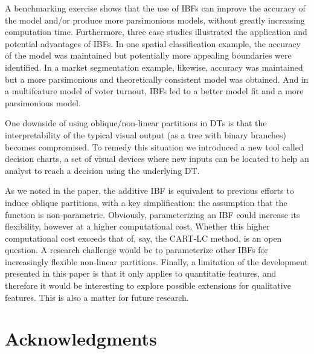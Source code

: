 \documentclass[]{elsarticle} %
\begin{document}
A benchmarking exercise shows that the use of IBFs can improve the
accuracy of the model and/or produce more parsimonious models, without
greatly increasing computation time. Furthermore, three case studies
illustrated the application and potential advantages of IBFs. In one
spatial classification example, the accuracy of the model was maintained
but potentially more appealing boundaries were identified. In a market
segmentation example, likewise, accuracy was maintained but a more
parsimonious and theoretically consistent model was obtained. And in a
multifeature model of voter turnout, IBFs led to a better model fit and
a more parsimonious model.

One downside of using oblique/non-linear partitions in DTs is that the
interpretability of the typical visual output (as a tree with binary
branches) becomes compromised. To remedy this situation we introduced a
new tool called decision charts, a set of visual devices where new
inputs can be located to help an analyst to reach a decision using the
underlying DT.

As we noted in the paper, the additive IBF is equivalent to previous
efforts to induce oblique partitions, with a key simplification: the
assumption that the function is non-parametric. Obviously,
parameterizing an IBF could increase its flexibility, however at a
higher computational cost. Whether this higher computational cost
exceeds that of, say, the CART-LC method, is an open question. A
research challenge would be to parameterize other IBFs for increasingly
flexible non-linear partitions. Finally, a limitation of the development
presented in this paper is that it only applies to quantitatie features,
and therefore it would be interesting to explore possible extensions for
qualitative features. This is also a matter for future research.

\section{Acknowledgments}\label{acknowledgments}
\end{document}
